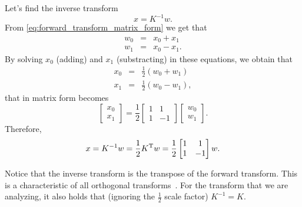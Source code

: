 Let's find the inverse
transform
\begin{equation}
  x = K^{-1}w.
  \label{eq:inverse_transform}
\end{equation}
From \ref{eq:forward_transform_matrix_form} we get that
\begin{equation}
  \begin{array}{rcl}
  w_0 & = & x_0 + x_1\\
  w_1 & = & x_0 - x_1.
  \end{array}
\end{equation}
By solving $x_0$ (adding) and $x_1$ (substracting) in
these equations, we obtain that
\begin{equation}
  \begin{array}{rcl}
  x_0 & = & \frac{1}{2}(w_0 + w_1)\\
  x_1 & = & \frac{1}{2}(w_0 - w_1),
  \end{array}
\end{equation}
that in matrix form becomes
\begin{equation}
  \begin{bmatrix}
    x_0 \\
    x_1
  \end{bmatrix}
  = \frac{1}{2}
  \begin{bmatrix} 1 & 1 \\ 1 & -1 \end{bmatrix}
  \begin{bmatrix}
    w_0 \\
    w_1
  \end{bmatrix}.
\end{equation}
Therefore,
\begin{equation}
  x = K^{-1}w = \frac{1}{2}K^{\text T}w = \frac{1}{2}\begin{bmatrix} 1 & 1 \\ 1 & -1 \end{bmatrix}w.
  \label{eq:inverse_transform_matrix_form}
\end{equation}

Notice that the inverse transform is the transpose of the forward
transform. This is a characteristic of all orthogonal
transforms~\cite{sayood2017introduction}. For the transform that we
are analyzing, it also holds that (ignoring the $\frac{1}{2}$ scale factor)
$K^{-1}=K$.

